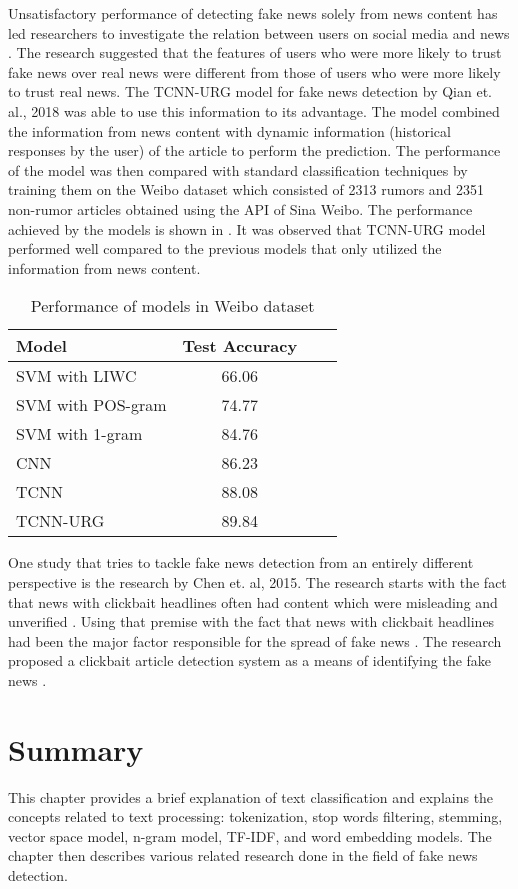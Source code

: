 Unsatisfactory performance of detecting fake news solely from news content has led researchers to investigate the relation between users on social media and news \cite{shu2018understanding}. The research suggested that the features of users who were more likely to trust fake news over real news were different from those of users who were more likely to trust real news. The TCNN-URG model for fake news detection by Qian et. al., 2018 was able to use this information to its advantage. The model combined the information from news content with dynamic information (historical responses by the user) of the article to perform the prediction. The performance of the model was then compared with standard classification techniques by training them on the Weibo dataset\cite{ma2016detecting} which consisted of 2313 rumors and 2351 non-rumor articles obtained using the API of Sina Weibo. The performance achieved by the models is shown in  \cite{qian2018neural}. It was observed that TCNN-URG model performed well compared to the previous models that only utilized the information from news content.

\begin{table}[h]
\begin{center}
\caption{Performance of models in Weibo dataset}
\label{tbl:weibo_performance}
\begin{tabular}{lccc}
\toprule 
\rule[-1pt]{0pt}{14pt}Model&Test Accuracy\\
\midrule 
SVM with LIWC&66.06\\
SVM with POS-gram&74.77\\
SVM with 1-gram&84.76\\
CNN&86.23\\
TCNN&88.08\\
TCNN-URG&89.84\\
\bottomrule
\end{tabular}
\end{center}
\end{table}

One study that tries to tackle fake news detection from an entirely different perspective is the research by Chen et. al, 2015. The research starts with the fact that news with clickbait headlines often had content which were misleading and unverified \cite{silverman2016analysis}. Using that premise with the fact that news with clickbait headlines had been the major factor responsible for the spread of fake news \cite{silverman2015lies}. The research proposed a clickbait article detection system as a means of identifying the fake news \cite{chen2015misleading}.

\section{Summary}
This chapter provides a brief explanation of text classification and explains the concepts related to text processing: tokenization, stop words filtering, stemming, vector space model, n-gram model, TF-IDF, and word embedding models. The chapter then describes various related research done in the field of fake news detection.